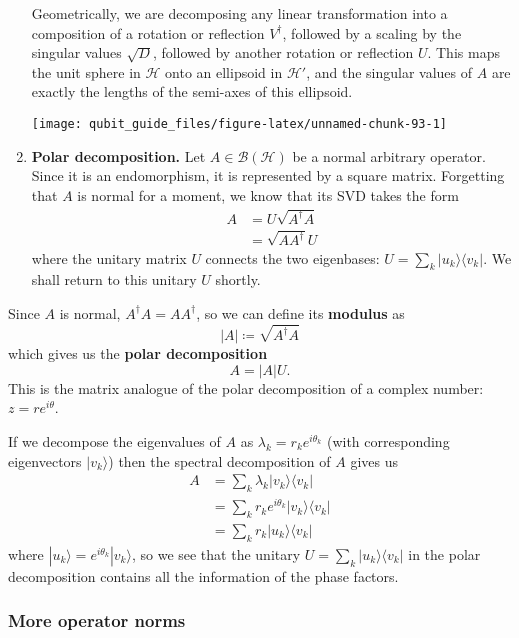 \documentclass[fleqn]{article}
\begin{document}
\begin{enumerate}
  Geometrically, we are decomposing any linear transformation into a composition of a rotation or reflection \(V^\dagger\), followed by a scaling by the singular values \(\sqrt{D}\), followed by another rotation or reflection \(U\).
  This maps the unit sphere in \(\mathcal{H}\) onto an ellipsoid in \(\mathcal{H}'\), and the singular values of \(A\) are exactly the lengths of the semi-axes of this ellipsoid.

  \begin{center}\texttt{[image: qubit\_guide\_files/figure-latex/unnamed-chunk-93-1]} \end{center}
\item
  \textbf{Polar decomposition.}
  Let \(A\in\mathcal{B}(\mathcal{H})\) be a normal arbitrary operator.
  Since it is an endomorphism, it is represented by a square matrix.
  Forgetting that \(A\) is normal for a moment, we know that its SVD takes the form
  \[
   \begin{aligned}
     A
     &= U\sqrt{A^\dagger A}
   \\&= \sqrt{AA^\dagger}U
   \end{aligned}
    \]
  where the unitary matrix \(U\) connects the two eigenbases: \(U=\sum_k|u_k\rangle\langle v_k|\).
  We shall return to this unitary \(U\) shortly.
\end{enumerate}

Since \(A\) is normal, \(A^\dagger A=AA^\dagger\), so we can define its \textbf{modulus} as
\[
    |A| \coloneqq \sqrt{A^\dagger A}
  \]
which gives us the \textbf{polar decomposition}
\[
    A = |A|U.
  \]
This is the matrix analogue of the polar decomposition of a complex number: \(z=re^{i\theta}\).

If we decompose the eigenvalues of \(A\) as \(\lambda_k=r_k e^{i\theta_k}\) (with corresponding eigenvectors \(|v_k\rangle\)) then the spectral decomposition of \(A\) gives us
\[
    \begin{aligned}
      A
      &= \sum_k \lambda_k|v_k\rangle\langle v_k|
    \\&= \sum_k r_ke^{i\theta_k}|v_k\rangle\langle v_k|
    \\&= \sum_k r_k|u_k\rangle\langle v_k|
    \end{aligned}
  \]
where \(|u_k\rangle=e^{i\theta_k}|v_k\rangle\), so we see that the unitary \(U=\sum_k|u_k\rangle\langle v_k|\) in the polar decomposition contains all the information of the phase factors.

\hypertarget{more-operator-norms}{%
\subsubsection{More operator norms}\label{more-operator-norms}}
\end{document}
